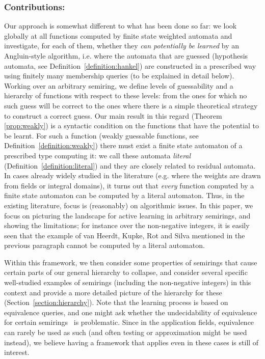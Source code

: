 \documentclass[10pt,a4paper]{amsart}
\theoremstyle{definition}
\numberwithin{equation}{section}
\numberwithin{theorem}{section}
\begin{document}
\subsubsection*{\textbf{Contributions:}} Our approach is somewhat different to what has been done so far: we look globally at all functions computed by finite state weighted automata and investigate, for each of them, whether they \emph{can potentially be learned} by an Angluin-style algorithm, i.e. where the automata that are guessed (hypothesis automata, see Definition~\ref{definition:hankel}) are constructed in a prescribed way using finitely many membership queries (to be explained in detail below). Working over an arbitrary semiring, we define levels of guessability and a hierarchy of functions with respect to these levels: from the ones for which no such guess will be correct to the ones where there is a simple theoretical strategy to construct a correct guess. Our main result in this regard (Theorem \ref{prop:weakly}) is a syntactic condition on the functions that have the potential to be learnt. For such a function (weakly guessable functions, see Definition~\ref{definition:weakly}) there must exist a finite state automaton of a prescribed type computing it: we call these automata \emph{literal} (Definition~\ref{definition:literal}) and they are closely related to residual automata.  In cases already widely studied in the literature (e.g. where the weights are drawn from fields or integral domains), it turns out that \emph{every} function computed by a finite state automaton can be computed by a literal automaton. Thus, in the existing literature, focus is (reasonably) on algorithmic issues. In this paper, we focus on picturing the landscape for active learning in arbitrary semirings, and showing the limitations; for instance over the non-negative integers,  it is easily seen that the example of van Heerdt, Kupke, Rot and Silva mentioned in the previous paragraph cannot be computed by a literal automaton. 

Within this framework, we then consider some properties of semirings that cause certain parts of our general hierarchy to collapse, and consider several specific well-studied examples of semirings (including the non-negative integers) in this context and provide a more detailed picture of the hierarchy for these (Section~\ref{section:hierarchy}). Note that the learning process is based on equivalence queries, and one might ask whether the undecidability of equivalence for certain semirings~\cite{Krob92} is problematic. Since in the application fields, equivalence can rarely be used as such (and often testing or approximation might be used instead), we believe having a framework that applies even in these cases is still of interest.
\end{document}
